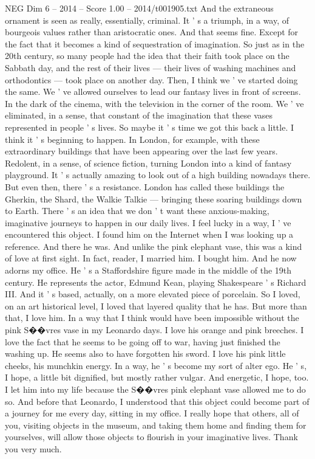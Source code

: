 \begin{textsample}{NEG Dim 6 – 2014 – Score 1.00 – 2014/t001905.txt}
And the extraneous ornament is seen as really, essentially, criminal.
It ' s a triumph, in a way, of bourgeois values rather than aristocratic ones.
And that seems fine.
Except for the fact that it becomes a kind of sequestration of imagination.
So just as in the 20th century, so many people had the idea that their faith took place on the Sabbath day, and the rest of their lives — their lives of washing machines and orthodontics — took place on another day.
Then, I think we ' ve started doing the same.
We ' ve allowed ourselves to lead our fantasy lives in front of screens.
In the dark of the cinema, with the television in the corner of the room.
We ' ve eliminated, in a sense, that constant of the imagination that these vases represented in people ' s lives.
So maybe it ' s time we got this back a little.
I think it ' s beginning to happen.
In London, for example, with these extraordinary buildings that have been appearing over the last few years.
Redolent, in a sense, of science fiction, turning London into a kind of fantasy playground.
It ' s actually amazing to look out of a high building nowadays there.
But even then, there ' s a resistance.
London has called these buildings the Gherkin, the Shard, the Walkie Talkie — bringing these soaring buildings down to Earth.
There ' s an idea that we don ' t want these anxious-making, imaginative journeys to happen in our daily lives.
I feel lucky in a way, I ' ve encountered this object.
I found him on the Internet when I was looking up a reference.
And there he was.
And unlike the pink elephant vase, this was a kind of love at first sight.
In fact, reader, I married him.
I bought him.
And he now adorns my office.
He ' s a Staffordshire figure made in the middle of the 19th century.
He represents the actor, Edmund Kean, playing Shakespeare ' s Richard III.
And it ' s based, actually, on a more elevated piece of porcelain.
So I loved, on an art historical level, I loved that layered quality that he has.
But more than that, I love him.
In a way that I think would have been impossible without the pink S{\EmojiFont �}{\EmojiFont �}vres vase in my Leonardo days.
I love his orange and pink breeches.
I love the fact that he seems to be going off to war, having just finished the washing up.
He seems also to have forgotten his sword.
I love his pink little cheeks, his munchkin energy.
In a way, he ' s become my sort of alter ego.
He ' s, I hope, a little bit dignified, but mostly rather vulgar.
And energetic, I hope, too.
I let him into my life because the S{\EmojiFont �}{\EmojiFont �}vres pink elephant vase allowed me to do so.
And before that Leonardo, I understood that this object could become part of a journey for me every day, sitting in my office.
I really hope that others, all of you, visiting objects in the museum, and taking them home and finding them for yourselves, will allow those objects to flourish in your imaginative lives.
Thank you very much.

\end{textsample}
